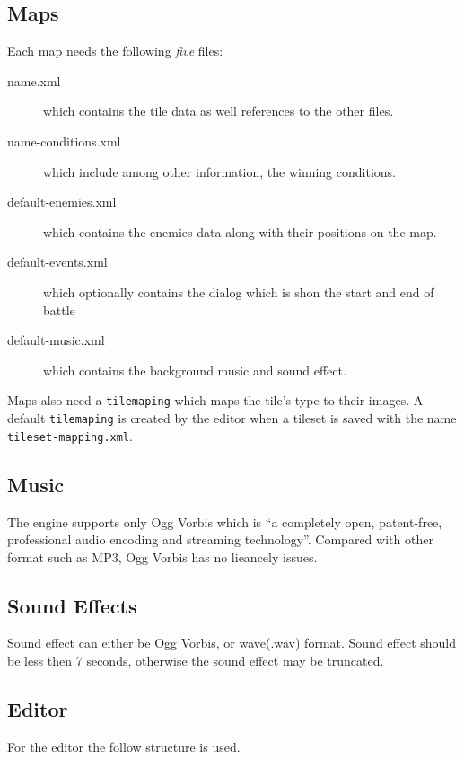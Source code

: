 \subsection{Maps}
\label{sub:amaps}

Each map needs the following \emph{five} files:
\begin{description}
	\item[name.xml] which contains the tile data as well references to the other files. 
	\item[name-conditions.xml]  which include among other information, the  winning conditions. 
	\item[default-enemies.xml]  which contains the enemies data along with their positions on the map.
	\item[default-events.xml]   which optionally contains the dialog which is shon the start and end of battle
	\item[default-music.xml]    which contains the background music and sound effect.
\end{description}

Maps also need a \texttt{tilemaping} which maps the tile's type to their images.  A default \texttt{tilemaping} is created by the editor when a tileset is saved with the name \texttt{tileset-mapping.xml}.

\subsection{Music}
The engine supports only Ogg Vorbis which is ``a completely open, patent-free, professional audio encoding and streaming technology''\cite{ogg}.
Compared with other format such as MP3, Ogg Vorbis has no lieancely issues. 

\subsection{Sound Effects}
Sound effect can either be Ogg Vorbis, or wave(.wav) format. Sound effect should be less then 7 seconds, otherwise the sound effect may be truncated. 

\clearpage
\subsection{Editor}
For the editor the follow structure is used.

